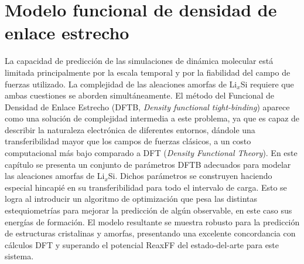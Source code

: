 \chapter{Modelo funcional de densidad de enlace estrecho}\label{ch:modelo}
\thispagestyle{empty}

\vspace{50pt}

\begin{adjustwidth}{50pt}{50pt}
    La capacidad de predicción de las simulaciones de dinámica molecular está 
    limitada principalmente por la escala temporal y por la fiabilidad del campo
    de fuerzas utilizado. La complejidad de las aleaciones amorfas de Li$_x$Si 
    requiere que ambas cuestiones se aborden simultáneamente. El método del 
    Funcional de Densidad de Enlace Estrecho (DFTB, \textit{Density functional 
    tight-binding}) aparece como una solución de complejidad intermedia a este
    problema, ya que es capaz de describir la naturaleza electrónica de diferentes 
    entornos, dándole una transferibilidad mayor que los campos de fuerzas clásicos, 
    a un costo computacional más bajo comparado a DFT (\textit{Density Functional
    Theory}). En este capítulo se presenta un conjunto de parámetros DFTB adecuados
    para modelar las aleaciones amorfas de Li$_x$Si. Dichos parámetros se 
    construyen haciendo especial hincapié en su transferibilidad para todo el 
    intervalo de carga. Esto se logra al introducir un algoritmo de optimización 
    que pesa las distintas estequiometrías para mejorar la predicción de algún 
    observable, en este caso sus energías de formación. El modelo resultante se 
    muestra robusto para la predicción de estructuras cristalinas y amorfas, 
    presentando una excelente concordancia con cálculos DFT y superando el 
    potencial ReaxFF del estado-del-arte para este sistema.
\end{adjustwidth}

\clearpage
\newpage
\thispagestyle{empty}
\mbox{}
\newpage









